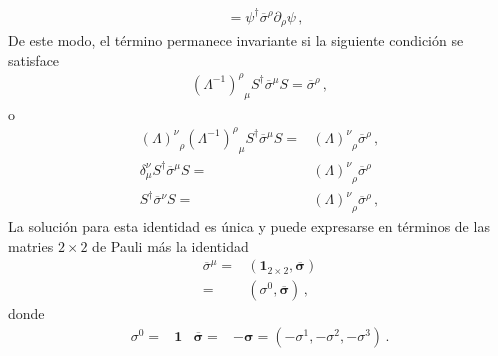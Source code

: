 \begin{frame}
\begin{align}
&=\psi^{\dagger}\overline{\sigma}^\rho\partial_\rho\psi\,,
\end{align}
De este modo, el término permanece invariante si la siguiente condición se satisface
\begin{align}
 {\left(\Lambda^{-1}\right)^\rho}_\mu  S^{\dagger}\overline{\sigma}^\mu S=\overline{\sigma}^\rho\,,
\end{align}
o
\begin{align}
\label{eq:ltrincond}
{\left(\Lambda\right)^\nu}_\rho{\left(\Lambda^{-1}\right)^\rho}_\mu   S^{\dagger}\overline{\sigma}^\mu S=&
{\left(\Lambda\right)^\nu}_\rho \overline{\sigma}^\rho\,,\nonumber\\
\delta^{\nu}_{\mu}   S^{\dagger}\overline{\sigma}^\mu S=&
{\left(\Lambda\right)^\nu}_\rho \overline{\sigma}^\rho \nonumber\\
S^{\dagger}\overline{\sigma}^\nu S=&{\left(\Lambda\right)^\nu}_\rho \overline{\sigma}^\rho\,,
\end{align}
La solución para esta identidad es única y puede expresarse en términos de las matries  $2\times2$ de Pauli más la identidad
   \begin{align} 
 \overline{\sigma}^{\mu}=& \left( \boldsymbol{1}_{2\times2},\overline{\boldsymbol{\sigma}} \right) \nonumber\\
 =& \left( \sigma^0,\overline{\boldsymbol{\sigma}} \right)\,, 
\end{align}
donde
\begin{align}
\sigma^0=& \boldsymbol{1} & \overline{\boldsymbol{\sigma}}=&-\boldsymbol{\sigma}=\left(-\sigma^1,-\sigma^2,-\sigma^3\right)\,.
\end{align}
\end{frame}
